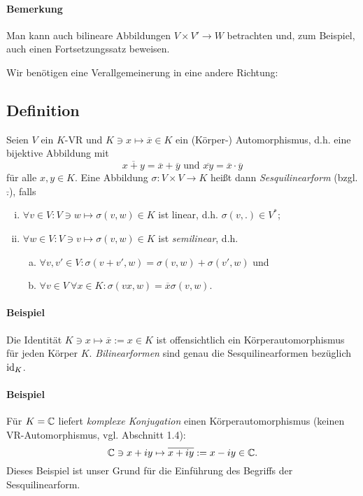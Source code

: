 \paragraph{Bemerkung}
	Man kann auch bilineare Abbildungen $ V\times V'\to W $ betrachten und, zum Beispiel, auch einen Fortsetzungssatz beweisen.
	
	Wir benötigen eine Verallgemeinerung in eine andere Richtung:
\subsection{Definition} 
\begin{Definition}[Sesquilinearform]
Seien $ V $ ein $ K $-VR und $ K\ni x\mapsto \overline{x}\in K $ ein (Körper-) Automorphismus, d.h. eine bijektive Abbildung mit
		\[ \overline{x+y} = \overline{x}+\overline{y} \text{ und } \overline{xy} = \overline{x}\cdot \overline{y} \]
	für alle $ x,y\in K $. Eine Abbildung $ \sigma: V\times V \to K $ heißt dann \emph{Sesquilinearform} (bzgl. $ \bar{.} $), falls
		\begin{enumerate}[(i)]
			\item $ \forall v\in V: V\ni w \mapsto \sigma(v,w)\in K $ ist linear, d.h. $ \sigma(v,.)\in V^* $;
			\item $ \forall w\in V: V\ni v \mapsto \sigma(v,w)\in K $ ist \emph{semilinear}, d.h.
				\begin{enumerate}[(a)]
					\item $ \forall v,v' \in V: \sigma(v+v',w) = \sigma(v,w)+\sigma(v',w) $ und
					\item $ \forall v\in V\ \forall x\in K: \sigma(vx,w) = \overline{x}\sigma(v,w) $.
				\end{enumerate}
		\end{enumerate}
\end{Definition}

\paragraph{Beispiel}
	Die Identität $ K\ni x\mapsto \overline{x}:= x\in K $ ist offensichtlich ein Körperautomorphismus für jeden Körper $ K $. \emph{Bilinearformen} sind genau die Sesquilinearformen bezüglich $ \operatorname{id}_K $.
\paragraph{Beispiel}
	Für $ K = \mathbb{C} $ liefert \emph{komplexe Konjugation} einen Körperautomorphismus (keinen VR-Automorphismus, vgl. Abschnitt 1.4):
		\[ \mathbb{C}\ni x+iy \mapsto \overline{x+iy}:= x-iy \in \mathbb{C}. \]
	Dieses Beispiel ist unser Grund für die Einführung des Begriffs der Sesquilinearform.
